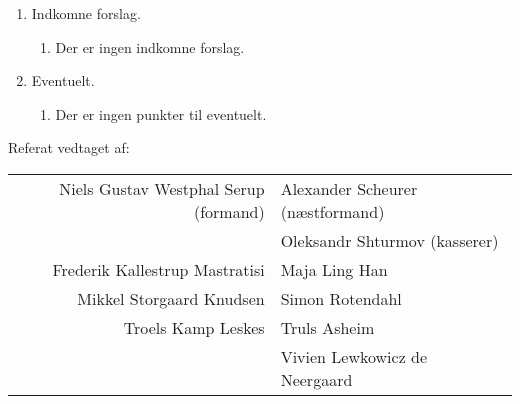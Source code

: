 \documentclass[a4paper]{article}
\begin{document}
\begin{enumerate}
\begin{enumerate}
\begin{enumerate}
\end{enumerate}

\end{enumerate}

\item[\textsection 9] Indkomne forslag.

\begin{enumerate}

\item Der er ingen indkomne forslag.

\end{enumerate}

\item[\textsection 10] Eventuelt.

\begin{enumerate}

\item Der er ingen punkter til eventuelt.

\end{enumerate}

\end{enumerate}

\vfill\noindent Referat vedtaget af:\\

\begin{center}
\begin{tabular}{rl}
Niels Gustav Westphal Serup (formand) \hspace{4mm}&\hspace{4mm} Alexander Scheurer (næstformand)\\[10mm]
&\hspace{-28mm}Oleksandr Shturmov (kasserer)\\[10mm]
Frederik Kallestrup Mastratisi \hspace{4mm}&\hspace{4mm} Maja Ling Han\\[10mm]
Mikkel Storgaard Knudsen \hspace{4mm}&\hspace{4mm} Simon Rotendahl\\[10mm]
Troels Kamp Leskes \hspace{4mm}&\hspace{4mm} Truls Asheim\\[10mm]
&\hspace{-28mm}Vivien Lewkowicz de Neergaard\\[10mm]
\end{tabular}
\end{center}
\end{document}
